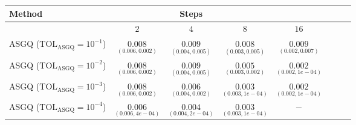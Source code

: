 \FloatBarrier

\begin{table}[h!]
	\begin{small}
		\centering
		\begin{tabular}{l*{6}{c}r}
			\toprule[1.5pt]
			Method & & Steps  & &     \\
			\hline	
			& $2$ & $4$ & $8$ & $16$  \\
			\hline
			
			ASGQ ($\text{TOL}_{\text{ASGQ}}=10^{-1}$)  &  $\underset{(0.006,0.002)}{\mathbf{0.008}}$ & $\underset{(0.004,0.005)}{\mathbf{0.009}}$& $\underset{(0.003,0.005)}{\mathbf{ 0.008}}$ & $\underset{(0.002,0.007)}{\mathbf{ 0.009}}$   \\
			
			ASGQ ($\text{TOL}_{\text{ASGQ}}=10^{-2}$)  &  $\underset{(0.006,0.002)}{\mathbf{0.008}}$ & $\underset{(0.004,0.005)}{\mathbf{0.009}}$& $\underset{(0.003,0.002)}{\mathbf{ 0.005}}$ & $\underset{(0.002,1e-04)}{\mathbf{ 0.002}}$  \\
			ASGQ ($\text{TOL}_{\text{ASGQ}}=10^{-3}$)  &  $\underset{(0.006,0.002)}{\mathbf{0.008}}$& $\underset{(0.004,0.002)}{\mathbf{0.006}}$& $\underset{(0.003,1e-04)}{\mathbf{0.003}}$  & $\underset{(0.002,1e-04)}{\mathbf{ 0.002}}$  \\
			ASGQ ($\text{TOL}_{\text{ASGQ}}=10^{-4}$)  &  $\underset{(0.006,4e-04)}{\mathbf{0.006}}$ & $\underset{(0.004,2e-04)}{\mathbf{0.004}}$& $\underset{(0.003,1e-04)}{\mathbf{0.003}}$ & $\mathbf{ -}$ \\
			

\end{tabular}
\end{small}
\end{table}
